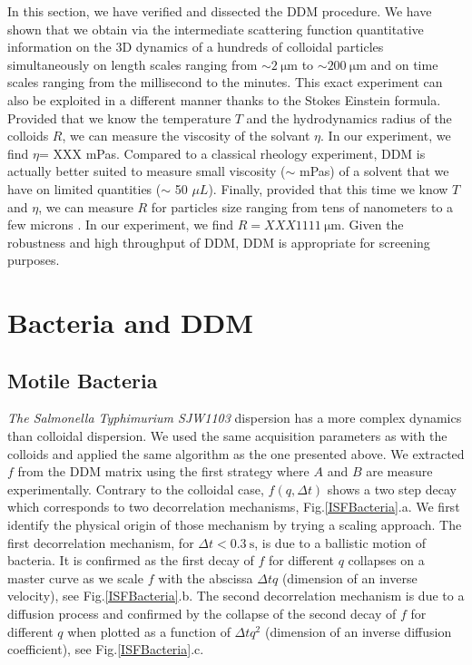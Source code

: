 \documentclass[prb,reprint,amsmath,amssymb]{revtex4-1}
\newcommand{\tg}[1]{{\color{magenta}#1}} %
\begin{document}
In this section, we have verified and dissected the DDM procedure. We have shown that we obtain via the intermediate scattering function quantitative information on the 3D dynamics of a hundreds of colloidal particles simultaneously on length scales ranging from $\sim \SI{2}{\micro\meter}$ to $\sim \SI{200}{\micro\meter}$ and on time scales ranging from the millisecond to the minutes. This exact experiment can also be exploited in a different manner thanks to the Stokes Einstein formula. Provided  that we know the temperature $T$ and the hydrodynamics radius of the colloids $R$, we can measure the viscosity of the solvant $\eta$. \tg{In our experiment, we find $\eta$= XXX mPas}. Compared to a classical rheology experiment, DDM is actually better suited to measure small viscosity ($\sim$ mPas) of a solvent that we have on limited quantities ($\sim$ 50 $\mu L$). Finally, provided that this time we know $T$ and $\eta$, we can measure $R$ for particles size ranging from tens of nanometers to a few microns \cite{2_DDM}.  \tg{In our experiment, we find $R= XXX\SI{1111}{\micro\meter}$}. Given the robustness and high throughput of DDM, DDM is appropriate for screening purposes.

\section{Bacteria and DDM}
\label{sec:BactSection}

\subsection{Motile Bacteria}

\tg{\textit{The Salmonella Typhimurium SJW1103} dispersion has a more complex dynamics than colloidal dispersion. We used the same acquisition parameters as with the colloids and applied the same algorithm as the one presented above. We extracted $f$ from the DDM matrix using the first strategy where $A$ and $B$ are measure experimentally.} Contrary to the colloidal case, $f(q, \Delta t)$ shows a two step decay which corresponds to two decorrelation mechanisms, Fig.\ref{ISFBacteria}.a. We first identify the physical origin of those mechanism by trying a scaling approach. The first decorrelation mechanism, for $\Delta t < \SI{0.3}{\second}$, is due to a ballistic motion of bacteria. It is confirmed as the first decay of $f$  for different $q$  collapses on a master curve as we scale $f$ with the abscissa  $\Delta t q$ (dimension of an inverse velocity), see Fig.\ref{ISFBacteria}.b. The second decorrelation mechanism is due to a diffusion process and confirmed by the collapse of the second decay of $f$ for different $q$ when plotted as a function of $\Delta t q^2$ (dimension of an inverse diffusion coefficient), see Fig.\ref{ISFBacteria}.c.
\end{document}
